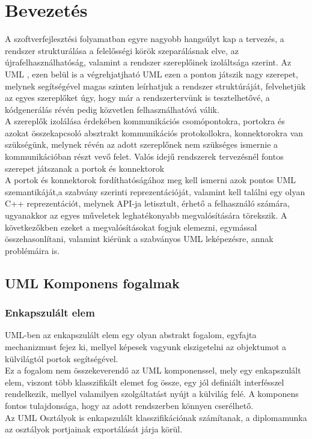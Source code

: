 \documentclass[a4paper,12pt]{report}
\begin{document}
\tableofcontents

\chapter{Bevezetés}
A szoftverfejlesztési folyamatban egyre nagyobb hangsúlyt kap a tervezés, a rendszer strukturálása a felelősségi körök szeparálásnak elve, az újrafelhasználhatóság, valamint a rendszer szereplőinek izoláltsága szerint. Az UML \cite{uml_omg}, ezen belül is a végrehjatjható UML ezen a ponton játszik nagy szerepet, melynek segítségével magas szinten leírhatjuk a rendszer struktúráját, felvehetjük az egyes szereplőket úgy, hogy már a rendszertervünk is tesztelhetővé, a kódgenerálás révén pedig közvetlen felhasználhatóvá válik. \\ A szereplők izolálása érdekében kommunikációs csomópontokra, portokra és azokat összekapcsoló absztrakt kommunikációs protokollokra, konnektorokra van szükségünk, melynek révén az adott szereplőnek nem szükséges ismernie a kommunikációban részt vevő felet. Valós idejű rendszerek tervezésnél fontos szerepet játszanak a portok és konnektorok \cite{uml_real}\\ 
A portok és konnektorok fordíthatóságához meg kell ismerni azok pontos UML szemantikáját,a szabvány szerinti reprezentációját, valamint kell találni egy olyan C++ reprezentációt, melynek API-ja letisztult, érhető a felhasználó számára, ugyanakkor az egyes műveletek leghatékonyabb megvalósítására törekszik. A következőkben ezeket a megvalósításokat fogjuk elemezni, egymással összehasonlítani, valamint kiérünk a szabványos UML leképezésre, annak problémáira is. 

\section{UML Komponens fogalmak}
\subsection{Enkapszulált elem}
UML-ben az enkapszulált elem egy olyan abstrakt fogalom, egyfajta mechanizmust fejez ki, mellyel képesek vagyunk elszigetelni az objektumot a külvilágtól portok segítségével.\\ Ez a fogalom nem összekeverendő az UML komponenssel, mely egy enkapszulált elem, viszont több klasszifikált elemet fog össze, egy jól definiált interfésszel rendelkezik, mellyel valamilyen szolgáltatást nyújt a külvilág felé. A komponens fontos tulajdonsága, hogy az adott rendszerben könnyen cserélhető. \\
Az UML Osztályok is enkapszulált klasszifikációnak számítanak, a diplomamunka az osztályok portjainak exportálását járja körül.
\end{document}

